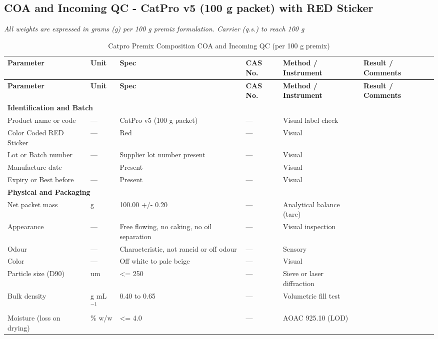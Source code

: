\subsection*{COA and Incoming QC - CatPro v5 (100 g packet) with RED Sticker}
\noindent\textit{All weights are expressed in grams (g) per 100 g premix formulation. Carrier (q.s.) to reach 100 g}
\begin{longtable}{@{}p{6.0cm}p{1.5cm}p{1.8cm}p{2.0cm}p{3.0cm}p{3.0cm}@{}}
\caption{Catpro Premix Composition COA and Incoming QC (per 100 g premix)}\\
\toprule
\textbf{Parameter} & \textbf{Unit} & \textbf{Spec} & \textbf{CAS No.} & \textbf{Method / Instrument} & \textbf{Result / Comments} \\
\midrule
\endfirsthead
\toprule
\textbf{Parameter} & \textbf{Unit} & \textbf{Spec} & \textbf{CAS No.} & \textbf{Method / Instrument} & \textbf{Result / Comments} \\
\midrule
\endhead

\multicolumn{6}{l}{\textbf{Identification and Batch}} \\[3pt]
Product name or code & --- & CatPro v5 (100 g packet) & --- & Visual label check & \\[3pt]
Color Coded RED Sticker & --- & Red & --- & Visual & \\[3pt]
Lot or Batch number & --- & Supplier lot number present & --- & Visual & \\[3pt]
Manufacture date & --- & Present & --- & Visual & \\[3pt]
Expiry or Best before & --- & Present & --- & Visual & \\[6pt]

\multicolumn{6}{l}{\textbf{Physical and Packaging}} \\[3pt]
Net packet mass & g & 100.00 +/- 0.20 & --- & Analytical balance (tare) & \\[3pt]
Appearance & --- & Free flowing, no caking, no oil separation & --- & Visual inspection & \\[3pt]
Odour & --- & Characteristic, not rancid or off odour & --- & Sensory & \\[3pt]
Color & --- & Off white to pale beige & --- & Visual & \\[3pt]
Particle size (D90) & um & <= 250 & --- & Sieve or laser diffraction & \\[3pt]
Bulk density & g mL$^{-1}$ & 0.40 to 0.65 & --- & Volumetric fill test & \\[3pt]
Moisture (loss on drying) & \% w/w & <= 4.0 & --- & AOAC 925.10 (LOD) & \\[6pt]


\end{longtable}
